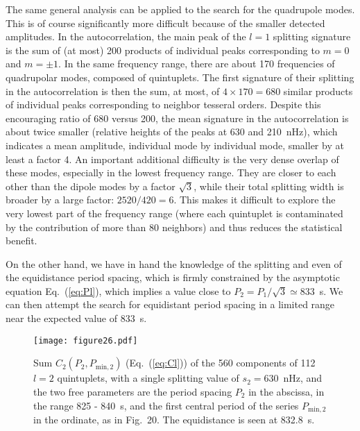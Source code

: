 \documentclass[bibyear]{aa}
\begin{document}
The same general analysis can be applied to the search for the quadrupole modes. This is of course significantly more difficult because of  the smaller detected amplitudes. In the autocorrelation, the main peak of the $l=1$ splitting signature is the sum of (at most) 200 products of individual peaks corresponding to $m=0$ and $m=\pm 1$. In the same frequency range, there are about 170 frequencies of quadrupolar modes, composed of quintuplets. The first signature of their splitting in the autocorrelation is then the sum, at most, of $4\times 170 = 680$ similar products of individual peaks corresponding to neighbor tesseral orders. Despite this encouraging ratio of 680 versus 200, the mean signature in the autocorrelation is about twice smaller (relative heights of the peaks at 630  and 210~nHz), which indicates a mean amplitude, individual mode by individual mode, smaller by at least a factor 4. An important additional difficulty is the very dense overlap of these modes, especially in the lowest frequency range.  They are closer to each other than the dipole modes by a factor $\sqrt3$, while their total splitting width is broader by a large factor: $2520/420 = 6$. This makes it difficult to explore the very lowest part of the frequency range (where each quintuplet is contaminated by the contribution of more than 80 neighbors) and thus reduces  the statistical benefit.

On the other hand, we have in hand the knowledge of the splitting and even of the equidistance period spacing, which is firmly constrained by the asymptotic equation Eq.~(\ref{eq:Pl}),
which implies a value close to $P_2 = P_1/\sqrt3\simeq 833$~s.
We can then attempt the search for equidistant period spacing in a limited range near the expected value of 833~s.

\begin{figure}
\centering
\texttt{[image: figure26.pdf]}
\caption{Sum $C_2(P_2,P_{\mathrm{min},2})$ (Eq.~(\ref{eq:Cl})) of the 560 components of 112 $l=2$ quintuplets, with a single splitting value of $s_2=630$~nHz, and the two free parameters are the period spacing $P_2$ in the abscissa, in the range 825 - 840~s, and the first central period of the series $P_{\mathrm{min},2}$ in the ordinate, as in Fig.~20. The equidistance is seen at 832.8~s. }
\label{fig:C2}
\end{figure} 
\end{document}
